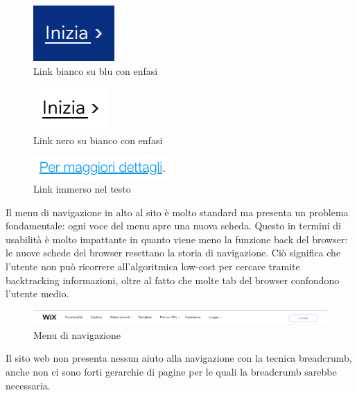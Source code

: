 \documentclass[11pt,a4paper]{article}
\begin{document}
\begin{figure}[H]
  \centering
  \includegraphics[]{img/link-white-on-blue-underline.png}
  \caption{Link bianco su blu con enfasi}
  \label{fig:link-white-on-blue-underline}
\end{figure}

\begin{figure}[H]
  \centering
  \includegraphics[]{img/link-black-on-white-underline.png}
  \caption{Link nero su bianco con enfasi}
  \label{fig:black-on-white-underline}
\end{figure}

\begin{figure}[H]
  \centering
  \includegraphics[]{img/link-text.png}
  \caption{Link immerso nel testo}
  \label{fig:link-text}
\end{figure}

Il menu di navigazione in alto al sito è molto standard ma presenta un
problema fondamentale: ogni voce del menu apre una nuova
scheda. Questo in termini di usabilità è molto impattante in quanto
viene meno la funzione back del browser: le nuove schede del browser
resettano la storia di navigazione. Ciò significa che l'utente non può
ricorrere all'algoritmica low-cost per cercare tramite backtracking
informazioni, oltre al fatto che molte tab del browser confondono
l'utente medio.

\begin{figure}[H]
  \centering
  \includegraphics[width=1\textwidth]{img/navbar.png}
  \caption{Menu di navigazione}
  \label{fig:navbar}
\end{figure}

Il sito web non presenta nessun aiuto alla navigazione con la tecnica
breadcrumb, anche non ci sono forti gerarchie di pagine per le quali
la breadcrumb sarebbe necessaria.
\end{document}
